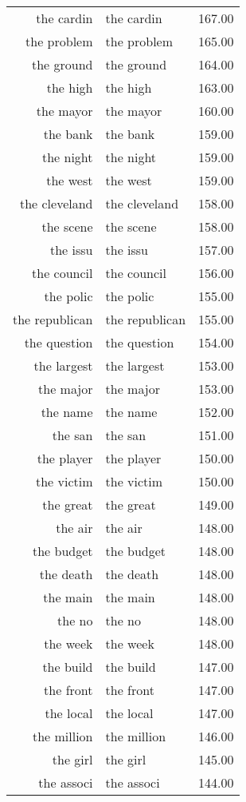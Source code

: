 \begin{table}[ht]
\begin{tabular}{rlr}
  the cardin & the cardin & 167.00 \\ 
  the problem & the problem & 165.00 \\ 
  the ground & the ground & 164.00 \\ 
  the high & the high & 163.00 \\ 
  the mayor & the mayor & 160.00 \\ 
  the bank & the bank & 159.00 \\ 
  the night & the night & 159.00 \\ 
  the west & the west & 159.00 \\ 
  the cleveland & the cleveland & 158.00 \\ 
  the scene & the scene & 158.00 \\ 
  the issu & the issu & 157.00 \\ 
  the council & the council & 156.00 \\ 
  the polic & the polic & 155.00 \\ 
  the republican & the republican & 155.00 \\ 
  the question & the question & 154.00 \\ 
  the largest & the largest & 153.00 \\ 
  the major & the major & 153.00 \\ 
  the name & the name & 152.00 \\ 
  the san & the san & 151.00 \\ 
  the player & the player & 150.00 \\ 
  the victim & the victim & 150.00 \\ 
  the great & the great & 149.00 \\ 
  the air & the air & 148.00 \\ 
  the budget & the budget & 148.00 \\ 
  the death & the death & 148.00 \\ 
  the main & the main & 148.00 \\ 
  the no & the no & 148.00 \\ 
  the week & the week & 148.00 \\ 
  the build & the build & 147.00 \\ 
  the front & the front & 147.00 \\ 
  the local & the local & 147.00 \\ 
  the million & the million & 146.00 \\ 
  the girl & the girl & 145.00 \\ 
  the associ & the associ & 144.00 \\ 

\end{tabular}
\end{table}
